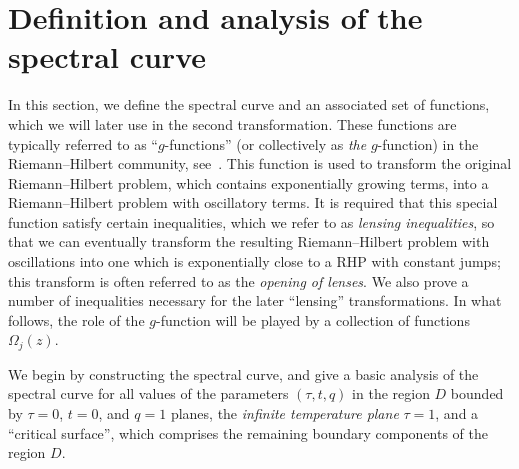 \documentclass[pdftex]{sigma}
\numberwithin{equation}{section}
\begin{document}
\section{Definition and analysis of the spectral curve}\label{section3}
In this section, we define the spectral curve and an associated set of functions, which we will later use in the second
transformation. These functions are typically referred to as ``$g$-functions'' (or collectively as \textit{the} $g$-function) in the Riemann--Hilbert community, see~\cite{DKMVZ}. This function is used to transform the original Riemann--Hilbert problem, which contains exponentially growing terms, into a Riemann--Hilbert problem with oscillatory terms. It is required that this special function satisfy certain inequalities, which we refer to as \textit{lensing inequalities}, so that we can eventually transform the resulting Riemann--Hilbert problem with oscillations
into one which is exponentially close to a RHP with constant jumps; this transform is often referred to as the \textit{opening of lenses}. We also prove a number of inequalities necessary for the later ``lensing'' transformations. In what follows, the role of the $g$-function will be
played by a collection of functions $\Omega_j(z)$.

We begin by constructing the spectral curve, and give a basic analysis of the spectral curve for
all values of the parameters $(\tau,t,q)$ in the region $D$ bounded by $\tau=0$, $t=0$, and $q=1$ planes, the \textit{infinite temperature plane} $\tau =1$, and a ``critical surface'', which comprises the remaining boundary components of the region $D$.
\end{document}
